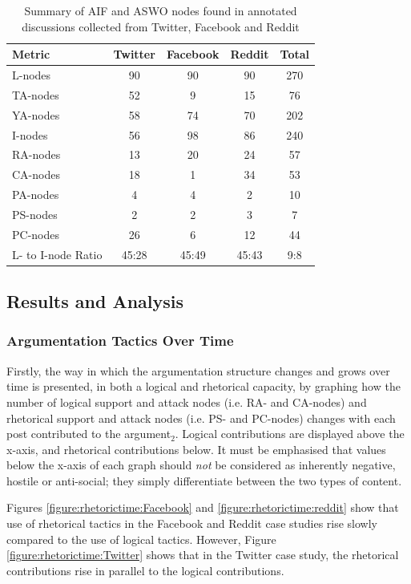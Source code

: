 \begin{table}
\centering
\caption{Summary of AIF and ASWO nodes found in annotated discussions collected from Twitter, Facebook and Reddit}
\label{table:aifnodes}
\begin{tabular}{| l | c | c | c | c |}
\hline
\textbf{Metric} & \textbf{Twitter} & \textbf{Facebook} & \textbf{Reddit} & \textbf{Total}\\
\hline
L-nodes & 90 & 90 & 90 & 270\\
\hline
TA-nodes & 52 & 9 & 15 & 76\\
\hline
YA-nodes & 58 & 74 & 70 & 202\\
\hline
I-nodes & 56 & 98 & 86 & 240\\
\hline
RA-nodes & 13 & 20 & 24 & 57\\
\hline
CA-nodes & 18 & 1 & 34 & 53\\
\hline
PA-nodes & 4 & 4 & 2 & 10\\
\hline
PS-nodes & 2 & 2 & 3 & 7\\
\hline
PC-nodes & 26 & 6 & 12 & 44\\
\hline
L- to I-node Ratio & 45:28 & 45:49 & 45:43 & 9:8\\
\hline
\end{tabular}
\end{table}


\subsection{Results and Analysis}
\label{aswo:results}

\newcommand{\scaleResults}{0.4}

\subsubsection{Argumentation Tactics Over Time}
Firstly, the way in which the argumentation structure changes and grows over time is presented, in both a logical and rhetorical capacity, by graphing how the number of logical support and attack nodes (i.e. RA- and CA-nodes) and rhetorical support and attack nodes (i.e. PS- and PC-nodes) changes with each post contributed to the argument$_2$. Logical contributions are displayed above the x-axis, and rhetorical contributions below. It must be emphasised that values below the x-axis of each graph should \textit{not} be considered as inherently negative, hostile or anti-social; they simply differentiate between the two types of content.

Figures \ref{figure:rhetorictime:Facebook} and \ref{figure:rhetorictime:reddit} show that use of rhetorical tactics in the Facebook and Reddit case studies rise slowly compared to the use of logical tactics. However, Figure \ref{figure:rhetorictime:Twitter} shows that in the Twitter case study, the rhetorical contributions rise in parallel to the logical contributions.

